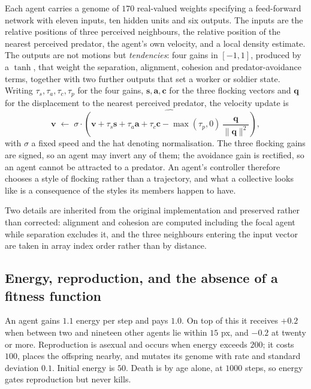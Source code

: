 \documentclass{artificial-life}
\begin{document}
Each agent carries a genome of $170$ real-valued weights specifying a
feed-forward network with eleven inputs, ten hidden units and six outputs. The
inputs are the relative positions of three perceived neighbours, the relative
position of the nearest perceived predator, the agent's own velocity, and a
local density estimate. The outputs are not motions but \emph{tendencies}: four
gains in $[-1,1]$, produced by a $\tanh$, that weight the separation, alignment,
cohesion and predator-avoidance terms, together with two further outputs that
set a worker or soldier state. Writing $\tau_s, \tau_a, \tau_c, \tau_p$ for the
four gains, $\mathbf{s}, \mathbf{a}, \mathbf{c}$ for the three flocking vectors
and $\mathbf{q}$ for the displacement to the nearest perceived predator, the
velocity update is
\begin{equation}\label{eqn:update}
\mathbf{v} \;\leftarrow\; \sigma \cdot \widehat{\left(
\mathbf{v} + \tau_s \mathbf{s} + \tau_a \mathbf{a} + \tau_c \mathbf{c}
- \max(\tau_p, 0)\,\frac{\mathbf{q}}{\|\mathbf{q}\|^{2}}\right)},
\end{equation}
with $\sigma$ a fixed speed and the hat denoting normalisation. The three
flocking gains are signed, so an agent may invert any of them; the avoidance
gain is rectified, so an agent cannot be attracted to a predator. An agent's
controller therefore chooses a style of flocking rather than a trajectory, and
what a collective looks like is a consequence of the styles its members happen
to have.

Two details are inherited from the original implementation and preserved rather
than corrected: alignment and cohesion are computed including the focal agent
while separation excludes it, and the three neighbours entering the input vector
are taken in array index order rather than by distance.

\subsection{Energy, reproduction, and the absence of a fitness function}
\label{sec:energy}

An agent gains $1.1$ energy per step and pays $1.0$. On top of this it receives
$+0.2$ when between two and nineteen other agents lie within $15$ px, and $-0.2$
at twenty or more. Reproduction is asexual and occurs when energy exceeds $200$;
it costs $100$, places the offspring nearby, and mutates its genome with rate
and standard deviation $0.1$. Initial energy is $50$. Death is by age alone, at
$1000$ steps, so energy gates reproduction but never kills.
\end{document}
